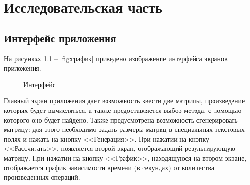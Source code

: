 \chapter{Исследовательская часть}

\section{Интерфейс приложения}

На рисункaх  \ref{fig:интерфейс} -- \ref{fig:график} приведено изображение интерфейса экранов приложения.

\begin{figure}[h!]
	\caption{Интерфейс}
	\label{fig:интерфейс}
\end{figure}


Главный экран приложения дает возможность ввести две матрицы, произведение которых будет вычисляться, а также предоставляется выбор метода, с помощью которого оно будет найдено. Также предусмотрена возможность сгенерировать матрицу: для этого необходимо задать размеры матриц в специальных текстовых полях и нажать на кнопку <<Генерация>>. При нажатии на кнопку <<Рассчитать>>, появляется второй экран, отображающий результирующую матрицу. При нажатии на кнопку <<График>>, находящуюся на втором экране, отображается график зависимости времени (в секундах) от количества произведенных операций.


